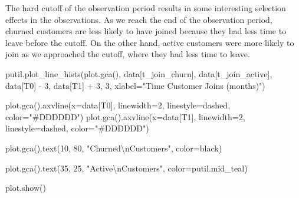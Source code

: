 \documentclass[
  letterpaper,
  DIV=11,
  numbers=noendperiod]{scrartcl}
\newenvironment{Shaded}{\begin{snugshade}}{\end{snugshade}}
\newcommand{\CharTok}[1]{\textcolor[rgb]{0.13,0.47,0.30}{#1}}
\newcommand{\DecValTok}[1]{\textcolor[rgb]{0.68,0.00,0.00}{#1}}
\newcommand{\NormalTok}[1]{\textcolor[rgb]{0.00,0.23,0.31}{#1}}
\newcommand{\OperatorTok}[1]{\textcolor[rgb]{0.37,0.37,0.37}{#1}}
\newcommand{\StringTok}[1]{\textcolor[rgb]{0.13,0.47,0.30}{#1}}
\begin{document}
The hard cutoff of the observation period results in some interesting
selection effects in the observations. As we reach the end of the
observation period, churned customers are less likely to have joined
because they had less time to leave before the cutoff. On the other
hand, active customers were more likely to join as we approached the
cutoff, where they had less time to leave.

\begin{Shaded}
\begin{Highlighting}[]
\NormalTok{putil.plot\_line\_hists(plot.gca(),}
\NormalTok{                      data[}\StringTok{\textquotesingle{}t\_join\_churn\textquotesingle{}}\NormalTok{],}
\NormalTok{                      data[}\StringTok{\textquotesingle{}t\_join\_active\textquotesingle{}}\NormalTok{],}
\NormalTok{                      data[}\StringTok{\textquotesingle{}T0\textquotesingle{}}\NormalTok{] }\OperatorTok{{-}} \DecValTok{3}\NormalTok{, data[}\StringTok{\textquotesingle{}T1\textquotesingle{}}\NormalTok{] }\OperatorTok{+} \DecValTok{3}\NormalTok{, }\DecValTok{3}\NormalTok{,}
\NormalTok{                      xlabel}\OperatorTok{=}\StringTok{"Time Customer Joins (months)"}\NormalTok{)}

\NormalTok{plot.gca().axvline(x}\OperatorTok{=}\NormalTok{data[}\StringTok{\textquotesingle{}T0\textquotesingle{}}\NormalTok{], linewidth}\OperatorTok{=}\DecValTok{2}\NormalTok{,}
\NormalTok{                   linestyle}\OperatorTok{=}\StringTok{\textquotesingle{}dashed\textquotesingle{}}\NormalTok{, color}\OperatorTok{=}\StringTok{"\#DDDDDD"}\NormalTok{)}
\NormalTok{plot.gca().axvline(x}\OperatorTok{=}\NormalTok{data[}\StringTok{\textquotesingle{}T1\textquotesingle{}}\NormalTok{], linewidth}\OperatorTok{=}\DecValTok{2}\NormalTok{,}
\NormalTok{                   linestyle}\OperatorTok{=}\StringTok{\textquotesingle{}dashed\textquotesingle{}}\NormalTok{, color}\OperatorTok{=}\StringTok{"\#DDDDDD"}\NormalTok{)}

\NormalTok{plot.gca().text(}\DecValTok{10}\NormalTok{, }\DecValTok{80}\NormalTok{, }\StringTok{"Churned}\CharTok{\textbackslash{}n}\StringTok{Customers"}\NormalTok{,}
\NormalTok{                color}\OperatorTok{=}\StringTok{\textquotesingle{}black\textquotesingle{}}\NormalTok{)}

\NormalTok{plot.gca().text(}\DecValTok{35}\NormalTok{, }\DecValTok{25}\NormalTok{, }\StringTok{"Active}\CharTok{\textbackslash{}n}\StringTok{Customers"}\NormalTok{,}
\NormalTok{                color}\OperatorTok{=}\NormalTok{putil.mid\_teal)}

\NormalTok{plot.show()}
\end{Highlighting}
\end{Shaded}
\end{document}
